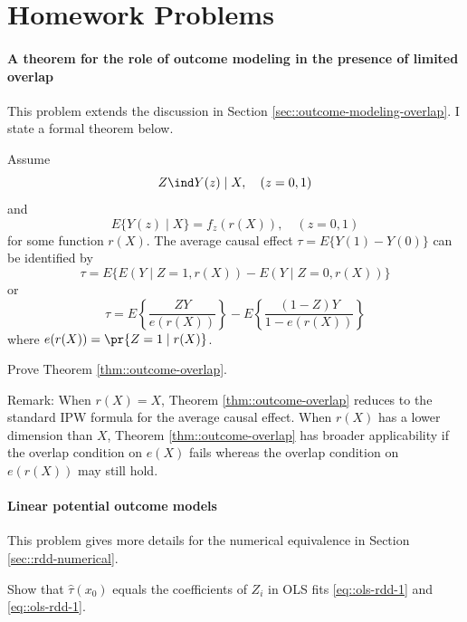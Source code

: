  
 
\section{Homework Problems}

 

\paragraph{A theorem for the role of outcome modeling in the presence of limited overlap}\label{hw::outcome-modeling-overlap}

This problem extends the discussion in Section \ref{sec::outcome-modeling-overlap}. I state a formal theorem below.

\begin{theorem}
\label{thm::outcome-overlap}
Assume 
$$
Z\ind Y(z) \mid X, \quad (z=0,1)
$$
and
$$
E\{  Y(z) \mid X \} = f_z( r(X)   ),\quad (z=0,1)
$$
for some function $r(X)$. 
The average causal effect $\tau = E\{ Y(1) - Y(0)  \}$ can be identified by
$$
\tau =E\{   E(Y\mid Z=1, r(X)) - E(Y\mid Z=0, r(X)) \} 
$$
or
$$
\tau = E\left\{   \frac{ZY}{  e(r(X)) }  \right\}  - E\left\{   \frac{(1-Z)Y}{ 1 -  e(r(X)) }  \right\}
$$
where $e(r(X)) = \pr\{ Z=1\mid r(X) \}$. 
\end{theorem}

Prove Theorem \ref{thm::outcome-overlap}.

Remark: When $r(X) = X$, Theorem \ref{thm::outcome-overlap} reduces to the standard IPW formula for the average causal effect. When $r(X)$ has a lower dimension than $X$, Theorem \ref{thm::outcome-overlap} has broader applicability if the overlap condition on $e(X)$ fails whereas the overlap condition on $e(r(X)) $ may still hold. 




 \paragraph{Linear potential outcome models}\label{hw::rdd-ols-fits}
 
 
 This problem gives more details for the numerical equivalence in Section \ref{sec::rdd-numerical}. 
 
 Show that $\hat\tau(x_0) $ equals the coefficients of $Z_i$ in OLS fits \eqref{eq::ols-rdd-1} and \eqref{eq::ols-rdd-1}. 
 


